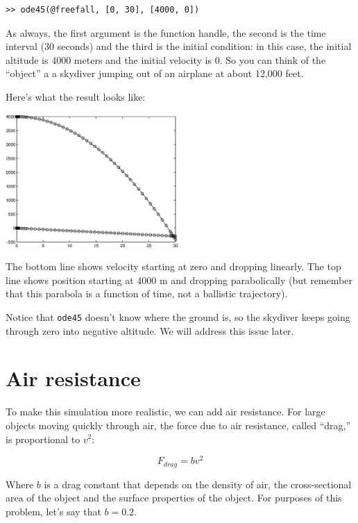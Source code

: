 \documentclass{book}
\begin{document}
\begin{verbatim}
>> ode45(@freefall, [0, 30], [4000, 0])
\end{verbatim}

As always, the first argument is the function handle, the second
is the time interval (30 seconds) and the third is the initial
condition: in this case, the initial altitude is 4000 meters and
the initial velocity is 0.  So you can think of the ``object'' a
a skydiver jumping out of an airplane at about 12,000 feet.

Here's what the result looks like:

\beforefig \centerline{\includegraphics[height=2in]{figs/freefall.eps}}

The bottom line shows velocity starting at zero and dropping
linearly.  The top line shows position starting at 4000 m and
dropping parabolically (but remember that this parabola
is a function of time, not a ballistic trajectory).

Notice that {\tt ode45} doesn't know where the ground is, so the
skydiver keeps going through zero into negative altitude.  We will
address this issue later.


\section{Air resistance}

To make this simulation more realistic, we can add air resistance.
For large objects moving quickly through air, the force due to air
resistance, called ``drag,'' is proportional to $v^2$:

\begin{equation}
F_{drag} = b v^2
\end{equation}

Where $b$ is a drag constant that depends on the density of
air, the cross-sectional area of the object and
the surface properties of the object.  For purposes of this
problem, let's say that $b = 0.2$.
\end{document}
